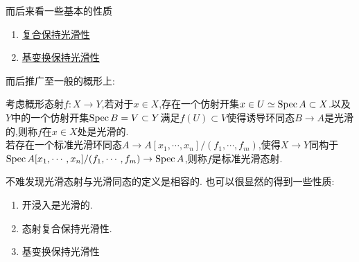 而后来看一些基本的性质
\begin{proposition}
    \begin{enumerate}
        \item \href{https://stacks.math.columbia.edu/tag/00TD}{复合保持光滑性}
        \item \href{https://stacks.math.columbia.edu/tag/00T4}{基变换保持光滑性}
    \end{enumerate}
\end{proposition}
而后推广至一般的概形上:
\begin{definition}[光滑态射]
    考虑概形态射$f : X \to Y$,若对于$x\in X$,存在一个仿射开集$x\in U \simeq \operatorname{Spec} A \subset X$.以及$Y$中的一个仿射开集$\operatorname{Spec} B = V \subset Y$满足$f(U) \subset V$使得诱导环同态$B \to A$是光滑的,则称$f$在$x\in X$处是光滑的.\\
    若存在一个标准光滑环同态$A \to A[x_1,\cdots,x_n]/(f_1,\cdots,f_m)$,使得$X \to Y$同构于$\operatorname{Spec} A[x_1,\cdots,x_n]/(f_1,\cdots,f_m) \to \operatorname{Spec} A$,则称$f$是标准光滑态射.
\end{definition}
不难发现光滑态射与光滑同态的定义是相容的.
也可以很显然的得到一些性质:
\begin{proposition}
    \begin{enumerate}
        \item 开浸入是光滑的.
        \item 态射复合保持光滑性.
        \item 基变换保持光滑性
    \end{enumerate}
\end{proposition}

